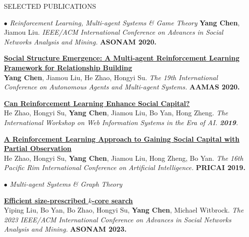 \documentclass{resume} %
\begin{document}
\begin{rSection}{SELECTED PUBLICATIONS}
\begin{rSubsection}{\large\em $\bullet$ Reinforcement Learning, Multi-agent Systems \& Game Theory}{}{}{}
		\textbf{Yang Chen}, Jiamou Liu. {\em IEEE/ACM International Conference on Advances in Social Networks Analysis and Mining.} \textbf{ASONAM 2020.}\\
	\item {\href{http://www.ifaamas.org/Proceedings/aamas2020/pdfs/p1807.pdf}{\bf Social Structure Emergence: A Multi-agent Reinforcement Learning Framework for Relationship Building}}\\ 
		\textbf{Yang Chen}, Jiamou Liu, He Zhao, Hongyi Su. {\em The 19th International Conference on Autonomous Agents and Multi-agent Systems.} \textbf{AAMAS 2020.}\\
	\item {\href{https://link.springer.com/chapter/10.1007/978-981-15-3281-8_14}{\bf Can Reinforcement Learning Enhance Social Capital?}}\\
		He Zhao, Hongyi Su, \textbf{Yang Chen}, Jiamou Liu, Bo Yan, Hong Zheng. {\em The International Workshop on Web Information Systems in the Era of AI. {\bf 2019}.}\\
	\item {\href{https://link.springer.com/chapter/10.1007/978-3-030-29908-8_9}{\bf A Reinforcement Learning Approach to Gaining Social Capital with Partial Observation}}\\
		He Zhao, Hongyi Su, \textbf{Yang Chen}, Jiamou Liu, Hong Zheng, Bo Yan. {\em The 16th Pacific Rim International Conference on Artificial Intelligence.} \textbf{PRICAI 2019.}\\
\end{rSubsection}

\begin{rSubsection}{\large\em $\bullet$ Multi-agent Systems \& Graph Theory}{}{}{}

\item {\href{}{\bf Efficient size-prescribed $k$-core search}}\\
		Yiping Liu, Bo Yan, Bo Zhao, Hongyi Su, \textbf{Yang Chen}, Michael Witbrock. {\em The 2023 IEEE/ACM International Conference on Advances in Social Networks Analysis and Mining.} \textbf{ASONAM 2023.}\\
	

\end{rSubsection}
\end{rSection}
\end{document}
